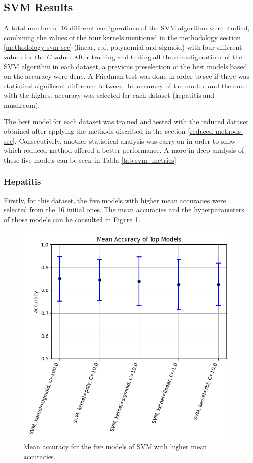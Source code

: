 \subsection{SVM Results}
A total number of 16 different configurations of the SVM algorithm were studied, combining the values of the four kernels mentioned in the methodology section \ref{methodology-svm-sec} (linear, rbf, polynomial and sigmoid) with four different values for the $C$ value. After training and testing all these configurations of the SVM algorithm in each dataset, a previous preselection of the best models based on the accuracy were done. A Friedman test was done in order to see if there was statistical significant difference between the accuracy of the models and the one with the highest accuracy was selected for each dataset (hepatitis and mushroom). 
\newline

The best model for each dataset was trained and tested with the reduced dataset obtained after applying the methods discribed in the section \ref{reduced-methods-sec}. Consecutively, another statistical analysis was carry on in order to show which reduced method offered a better performance. A more in deep analysis of these five models can be seen in Tabla \ref{tab:svm_metrics}.

\subsubsection{Hepatitis}
Firstly, for this dataset, the five models with higher mean accuracies were selected from the 16 initial ones. The mean accuracies and the hyperparameters of those models can be consulted in Figure \ref{fig:hep-svm-1}.

\begin{figure}[t]
    \centering
    \includegraphics[width=\textwidth]{figures/svm/hepatitis/statistical_analysis_results.png}
    \caption{Mean accuracy for the five models of SVM with higher mean accuracies.}
    \label{fig:hep-svm-1}
\end{figure}


